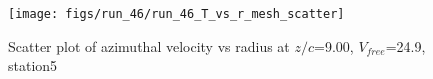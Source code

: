 \begin{figure}[H]
\centering
\texttt{[image: figs/run\_46/run\_46\_T\_vs\_r\_mesh\_scatter]}
\caption{Scatter plot of azimuthal velocity vs radius at $z/c$=9.00, $V_{free}$=24.9, station5}
\label{fig:run_46_T_vs_r_mesh_scatter}
\end{figure}


